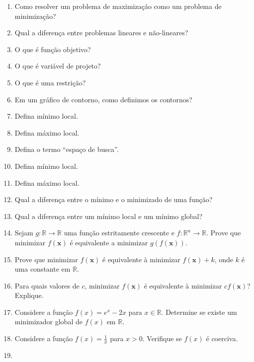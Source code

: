 \documentclass{article}
\newcommand{\x}{\mathbf{x}}
\begin{document}
\begin{enumerate}
    \item Como resolver um problema de maximização como um problema de minimização?
    \item Qual a diferença entre problemas lineares e não-lineares?
    \item O que é função objetivo?
    \item O que é variável de projeto?
    \item O que é uma restrição?
    \item Em um gráfico de contorno, como definimos os contornos?
    \item Defina mínimo local.
    \item Defina máximo local.
    \item Defina o termo ``espaço de busca''.
    \item Defina mínimo local.
    \item Defina máximo local.
    \item Qual a diferença entre o mínimo e o minimizado de uma função?
    \item Qual a diferença entre um mínimo local e um mínimo global?
    \item  Sejam $g : \mathbb{R} \rightarrow \mathbb{R}$ uma função estritamente crescente e $f : \mathbb{R}^n \rightarrow \mathbb{R}$. Prove que minimizar $f(\x)$ é equivalente a minimizar $g(f(\x))$.
    \item Prove que minimizar $f(\x)$ é equivalente à minimizar $f(\x) + k$, onde $k$ é uma constante em $\mathbb{R}$.
    \item Para quais valores de $c$, minimizar $f(\x)$ é equivalente à minimizar $cf(\x)$? Explique.
    \item Considere a função \(f(x) = e^x - 2x\) para \(x \in \mathbb{R}\). Determine se existe um minimizador global de \(f(x)\) em \(\mathbb{R}\).
    \item Considere a função \(f(x) = \frac{1}{x}\) para \(x > 0\). Verifique se \(f(x)\) é coerciva.
    \item  
\end{enumerate}




%
%
\end{document}

